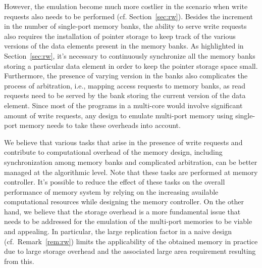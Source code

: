However, the emulation become much more costlier in the scenario when write requests also needs to be performed (cf. Section~\ref{sec:rw}). Besides the increment in the number of single-port memory banks, the ability to serve write requests also requires the installation of pointer storage to keep track of the various versions of the data elements present in the memory banks. As highlighted in Section~\ref{sec:rw}, it's necessary to continuously synchronize all the memory banks storing a particular data element in order to keep the pointer storage space small. Furthermore, the presence of varying version in the banks also complicates the process of arbitration, i.e., mapping access requests to memory banks, as read requests need to be served by the bank storing the current version of the data element. Since most of the programs in a multi-core would involve significant amount of write requests, any design to emulate multi-port memory using single-port memory needs to take these overheads into account. 

{\color{red}We believe that various tasks that arise in the presence of write requests and contribute to computational overhead of the memory design, including synchronization among memory banks and complicated arbitration, can be better managed at the algorithmic level. Note that these tasks are performed at memory controller. It's possible to reduce the effect of these tasks on the overall performance of memory system by relying on the increasing available computational resources while designing the memory controller. On the other hand, we believe that the storage overhead is a more fundamental issue that needs to be addressed for the emulation of the multi-port memories to be viable and appealing. In particular, the large replication factor in a naive design (cf.~Remark~\ref{rem:rw}) limits the applicability of the obtained memory in practice due to large storage overhead and the associated large area requirement resulting from this.}

